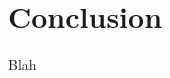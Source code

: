 \documentclass{sigchi}
\begin{document}
\section{Conclusion}

Blah

%
%
%
%
%
\balance



\end{document}
